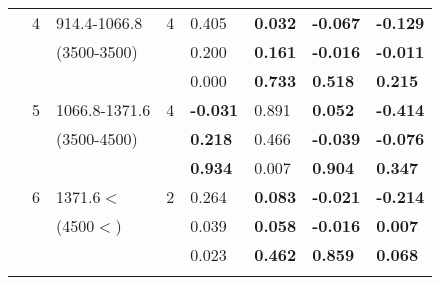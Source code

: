 \begin{table}[p]
\begin{tabular}{ccccllll}
 \multicolumn{1}{c}{} &  \multicolumn{1}{c}{4} &  \multicolumn{1}{l}{914.4-1066.8} &  \multicolumn{1}{c}{4} & 0.405 & \textbf{0.032 } & \textbf{-0.067 } & \textbf{-0.129 }  \\ 
  \multicolumn{1}{c}{} &  \multicolumn{1}{c}{} &  \multicolumn{1}{l}{(3500-3500)} &  \multicolumn{1}{c}{} & 0.200 & \textbf{0.161 } & \textbf{-0.016 } & \textbf{-0.011 }  \\ 
 \multicolumn{1}{c}{} &  \multicolumn{1}{c}{} &  \multicolumn{1}{c}{} &  \multicolumn{1}{c}{} & 0.000 & \textbf{0.733 } & \textbf{0.518 } & \textbf{0.215 }  \\ \cline{5-8}\noalign{\smallskip}
 \multicolumn{1}{c}{} &  \multicolumn{1}{c}{5} &  \multicolumn{1}{l}{1066.8-1371.6} &  \multicolumn{1}{c}{4} & \textbf{-0.031} & 0.891  & \textbf{0.052 } & \textbf{-0.414 }  \\ 
 \multicolumn{1}{c}{} &  \multicolumn{1}{c}{} &  \multicolumn{1}{l}{(3500-4500)} &  \multicolumn{1}{c}{} &\textbf{0.218}& 0.466  & \textbf{-0.039 } & \textbf{-0.076 }  \\ 
 \multicolumn{1}{c}{} &  \multicolumn{1}{c}{} &  \multicolumn{1}{c}{} &  \multicolumn{1}{c}{} &\textbf{0.934}& 0.007  & \textbf{0.904 } & \textbf{0.347 }  \\ \cline{5-8}\noalign{\smallskip}
  \multicolumn{1}{c}{} &  \multicolumn{1}{c}{6} &  \multicolumn{1}{l}{1371.6$<$} &  \multicolumn{1}{c}{2} &0.264& \textbf{0.083 } & \textbf{-0.021 } & \textbf{-0.214 }  \\ 
 \multicolumn{1}{c}{} &  \multicolumn{1}{c}{} &  \multicolumn{1}{l}{(4500$<$)} &  \multicolumn{1}{c}{} &0.039&  \textbf{0.058 } & \textbf{-0.016 } & \textbf{0.007 }  \\ 
 \multicolumn{1}{c}{} &  \multicolumn{1}{c}{} &  \multicolumn{1}{c}{} &  \multicolumn{1}{c}{} &0.023&  \textbf{0.462 } & \textbf{0.859 } & \textbf{0.068 }  \\  \hline\noalign{\smallskip}
\end{tabular}
\label{tab:time vars}
\end{table}
